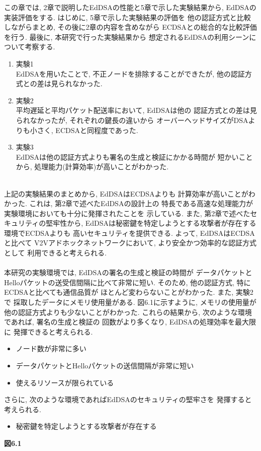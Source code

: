 この章では, 2章で説明したEdDSAの性能と5章で示した実験結果から, 
EdDSAの実装評価をする. はじめに, 5章で示した実験結果の評価を
他の認証方式と比較しながらまとめ, その後に2章の内容を含めながら
ECDSAとの総合的な比較評価を行う. 最後に, 本研究で行った実験結果から
想定されるEdDSAの利用シーンについて考察する.\\[1em]
\begin{enumerate}
  \item 実験1\\
  \indent EdDSAを用いたことで, 不正ノードを排除することができたが, 
  他の認証方式との差は見られなかった. 
  \item 実験2\\
  \indent 平均遅延と平均パケット配送率において, EdDSAは他の
  認証方式との差は見られなかったが, それぞれの鍵長の違いから
  オーバーヘッドサイズがDSAよりも小さく, ECDSAと同程度であった.
  \item 実験3\\
  \indent EdDSAは他の認証方式よりも署名の生成と検証にかかる時間が
  短かいことから, 処理能力(計算効率)が高いことがわかった.
\end{enumerate}

\\
\indent 上記の実験結果のまとめから, EdDSAはECDSAよりも
計算効率が高いことがわかった. これは, 第2章で述べたEdDSAの設計上の
特長である高速な処理能力が実験環境においても十分に発揮されたことを
示している. また, 第2章で述べたセキュリティの堅牢性から, 
EdDSAは秘密鍵を特定しようとする攻撃者が存在する環境でECDSAよりも
高いセキュリティを提供できる. よって, EdDSAはECDSAと比べて
V2Vアドホックネットワークにおいて, より安全かつ効率的な認証方式として
利用できると考えられる.\\

\\
\indent 本研究の実験環境では, EdDSAの署名の生成と検証の時間が
データパケットとHelloパケットの送受信間隔に比べて非常に短い. 
そのため, 他の認証方式, 特にECDSAと比べても通信品質が
ほとんど変わらないことがわかった. また, 実験2で
採取したデータにメモリ使用量がある. 図6.1に示すように,   
メモリの使用量が他の認証方式よりも少ないことがわかった. 
これらの結果から, 次のような環境であれば, 署名の生成と検証の
回数がより多くなり, EdDSAの処理効率を最大限に
発揮できると考えられる. 
\begin{itemize}
  \item ノード数が非常に多い
  \item データパケットとHelloパケットの送信間隔が非常に短い
  \item 使えるリソースが限られている
\end{itemize}
さらに, 次のような環境であればEdDSAのセキュリティの堅牢さを
発揮すると考えられる. 
\begin{itemize}
  \item 秘密鍵を特定しようとする攻撃者が存在する
\end{itemize} 

{\Large\textbf{図6.1}}\\







